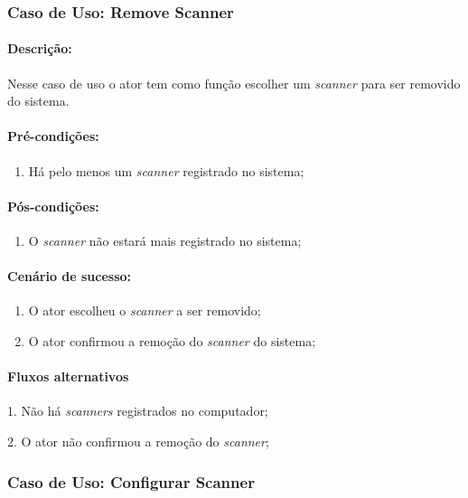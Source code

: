 \newpage
\subsubsection{Caso de Uso: Remove Scanner}

\paragraph{Descrição:} Nesse caso de uso o ator tem como função escolher um {\it scanner} para ser removido do sistema.

\paragraph{Pré-condições:}
\begin{enumerate}
    \item Há pelo menos um {\it scanner} registrado no sistema;
\end{enumerate}

\paragraph{Pós-condições:} 
\begin{enumerate}
    \item O {\it scanner} não estará mais registrado no sistema;
\end{enumerate}

\paragraph{Cenário de sucesso:}
\begin{enumerate}
    \item O ator escolheu o  {\it scanner} a ser removido;
    \item O ator confirmou a remoção do {\it scanner} do sistema;
\end{enumerate}

\paragraph{Fluxos alternativos}
\begin{description}
    \item 1. Não há {\it scanners} registrados no computador; 
    \item 2. O ator não confirmou a remoção do {\it scanner};
\end{description}

\newpage
\subsubsection{Caso de Uso: Configurar Scanner}

